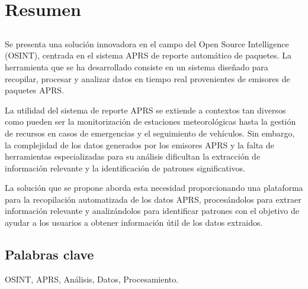 \chapter*{Resumen}

\section*{\tituloPortadaVal}

Se presenta una solución innovadora en el campo del Open Source Intelligence (OSINT), centrada en el sistema APRS de reporte automático de paquetes. La herramienta que se ha desarrollado consiste en un sistema diseñado para recopilar, procesar y analizar datos en tiempo real provenientes de emisores de paquetes APRS.

	La utilidad del sistema de reporte APRS se extiende a contextos tan diversos como pueden ser la monitorización de estaciones meteorológicas hasta la gestión de recursos en casos de emergencias y el seguimiento de vehículos. Sin embargo, la complejidad de los datos generados por los emisores APRS y la falta de herramientas especializadas para su análisis dificultan la extracción de información relevante y la identificación de patrones significativos.

	La solución que se propone aborda esta necesidad proporcionando una plataforma para la recopilación automatizada de los datos APRS, procesándolos para extraer información relevante y analizándolos para identificar patrones con el objetivo de ayudar a los usuarios a obtener información útil de los datos extraidos.


\section*{Palabras clave}
   
\noindent OSINT, APRS, Análisis, Datos, Procesamiento.

   


